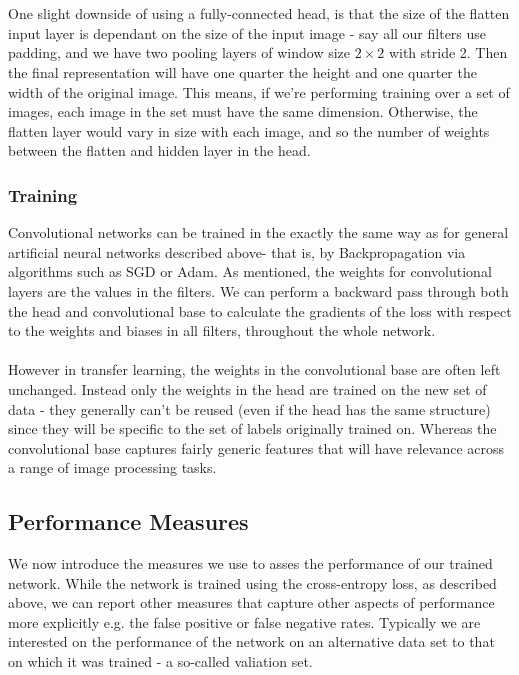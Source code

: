 \documentclass[11pt]{article} %
\theoremstyle{plain}
\theoremstyle{definition}
\begin{document}
\\
\\
\noindent
One slight downside of using a fully-connected head, is that the size of the flatten input layer is dependant on the size of the input image - say all our filters use padding, and we have two pooling layers of window size \(2 \times 2\) with stride 2. Then the final representation will have one quarter the height and one quarter the width of the original image. This means, if we're performing training over a set of images, each image in the set must have the same dimension. Otherwise, the flatten layer would vary in size with each image, and so the number of weights between the flatten and hidden layer in the head. 

\subsubsection{Training}
Convolutional networks can be trained in the exactly the same way as for general artificial neural networks described above- that is, by Backpropagation via algorithms such as SGD or Adam. As mentioned, the weights for convolutional layers are the values in the filters. We can perform a backward pass through both the head and convolutional base to calculate the gradients of the loss with respect to the weights and biases in all filters, throughout the whole network. 
\\
\\
\noindent
However in transfer learning, the weights in the convolutional base are often left unchanged. Instead only the weights in the head are trained on the new set of data - they generally can't be reused (even if the head has the same structure) since they will be specific to the set of labels originally trained on. Whereas the convolutional base captures fairly generic features that will have relevance across a range of image processing tasks. 

\newpage
\subsection{Performance Measures}
We now introduce the measures we use to asses the performance of our trained network. While the network is trained using the cross-entropy loss, as described above, we can report other measures that capture other aspects of performance more explicitly e.g. the false positive or false negative rates. Typically we are interested on the performance of the network on an alternative data set to that on which it was trained - a so-called valiation set.   
\end{document}
